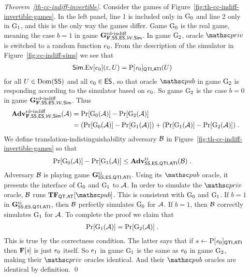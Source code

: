 \begin{proof}[Theorem~\ref{th-cc-indiff-invertible}] Consider the games of Figure~\ref{fig:th-cc-indiff-invertible-games}. In the left panel, line 1 is included only in $\textnormal{G}_0$ and line 2 only in $\textnormal{G}_1$, and this is the only way the games differ. Game $\textnormal{G}_0$ is the real game, meaning the case $b=1$ in game $\mathbf{G}^{\mathrm{rd\mbox{-}indiff}}_{\mathbf{F},\mathsf{SS},\mathsf{ES},{\cal W},\mathsf{Sim}}$. In game $\textnormal{G}_2$, oracle $\priv$ is switched to a random function $e_0$. From the description of the simulator in Figure~\ref{fig:cc-indiff-sims} we see that
	\begin{align*}
	\mathsf{Sim}.{\mathrm{Ev}}[e_0](\varepsilon,U) &= \mathrm{P}[\mathit{e}_0]_{\mathsf{QTI},\mathsf{ATI}}(U)
	\end{align*}
	for all $U\in \mathrm{Dom}(\mathsf{SS})$ and all $e_0\in\mathsf{ES}$, so that oracle $\pub$ in game $\textnormal{G}_2$ is responding according to the simulator based on $e_0$. So game $\textnormal{G}_2$ is the case $b=0$ in game $\mathbf{G}^{\mathrm{rd\mbox{-}indiff}}_{\mathbf{F},\mathsf{SS},\mathsf{ES},{\cal W},\mathsf{Sim}}$. Thus
	\begin{align*}
	\mathbf{Adv}^{\mathrm{rd\mbox{-}indiff}}_{\mathbf{F},\mathsf{SS},\mathsf{ES},{\cal W},\mathsf{Sim}}(\mathcal{A}) & =  \Pr[\textnormal{G}_0(\mathcal{A})] - \Pr[\textnormal{G}_2(\mathcal{A})] \\
	&= (\Pr[\textnormal{G}_0(\mathcal{A})] - \Pr[\textnormal{G}_1(\mathcal{A})])+(\Pr[\textnormal{G}_1(\mathcal{A})] - \Pr[\textnormal{G}_2(\mathcal{A})]) \;.
	\end{align*}
	We define translation-indistinguishability adversary $\mathcal{B}$ in Figure~\ref{fig:th-cc-indiff-invertible-games} so that 
	\begin{align*}
	\Pr[\textnormal{G}_0(\mathcal{A})] - \Pr[\textnormal{G}_1(\mathcal{A})] & \leq \mathbf{Adv}^{\mathrm{ti}}_{\mathsf{SS},\mathsf{ES},\mathsf{QTI},\mathsf{ATI}}(\mathcal{B}) \;.
	\end{align*}
	Adversary $\mathcal{B}$ is playing game  $\mathbf{G}^{\mathrm{ti}}_{\mathsf{SS},\mathsf{ES},\mathsf{QTI},\mathsf{ATI}}$. Using its $\pub$ oracle, it presents the interface of $\textnormal{G}_0$ and $\textnormal{G}_1$ to $\mathcal{A}$. In order to simulate the $\priv$ oracle, $\mathcal{B}$ runs $\construct{TF}_{\QuT,\AnT}[\pub]$. This is consistent with $\textnormal{G}_0$ and $\textnormal{G}_1$. If $b=1$ in $\mathbf{G}^{\mathrm{ti}}_{\mathsf{SS},\mathsf{ES},\mathsf{QTI},\mathsf{ATI}}$, then $\mathcal{B}$ perfectly simulates $\textnormal{G}_0$ for $\mathcal{A}$. If $b=1$, then $\mathcal{B}$ correctly simulates $\textnormal{G}_1$ for $\mathcal{A}$.
	To complete the proof we claim that  
	\begin{align*}
	\Pr[\textnormal{G}_1(\mathcal{A})] &= \Pr[\textnormal{G}_2(\mathcal{A})]  \;.
	\end{align*}
	This is true by the correctness condition. The latter says that if $s \gets \mathrm{P}[\mathit{e}_0]_{\mathsf{QTI},\mathsf{ATI}}$ then $\mathbf{F}[\mathit{s}]$ is just $e_0$ itself. So $e_1$ in game $\textnormal{G}_1$ is the same as $e_0$ in game $\textnormal{G}_2$, making their $\priv$ oracles identical. And their $\pub$ oracles are identical by definition. \qed
\end{proof}

